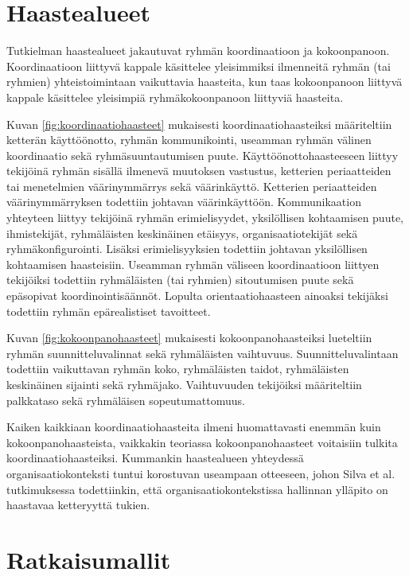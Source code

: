 \section{Haastealueet}

Tutkielman haastealueet jakautuvat ryhmän koordinaatioon ja kokoonpanoon. Koordinaatioon liittyvä kappale käsittelee yleisimmiksi ilmenneitä ryhmän (tai ryhmien) yhteistoimintaan vaikuttavia haasteita, kun taas kokoonpanoon liittyvä kappale käsittelee yleisimpiä ryhmäkokoonpanoon liittyviä haasteita. 

Kuvan \ref{fig:koordinaatiohaasteet} mukaisesti koordinaatiohaasteiksi määriteltiin ketterän käyttöönotto, ryhmän kommunikointi, useamman ryhmän välinen koordinaatio sekä ryhmäsuuntautumisen puute. Käyttöönottohaasteeseen liittyy tekijöinä ryhmän sisällä ilmenevä muutoksen vastustus, ketterien periaatteiden tai menetelmien väärinymmärrys sekä väärinkäyttö. Ketterien periaatteiden väärinymmärryksen todettiin johtavan väärinkäyttöön. Kommunikaation yhteyteen liittyy tekijöinä ryhmän erimielisyydet, yksilöllisen kohtaamisen puute, ihmistekijät, ryhmäläisten keskinäinen etäisyys, organisaatiotekijät sekä ryhmäkonfigurointi. Lisäksi erimielisyyksien todettiin johtavan yksilöllisen kohtaamisen haasteisiin. Useamman ryhmän väliseen koordinaatioon liittyen tekijöiksi todettiin ryhmäläisten (tai ryhmien) sitoutumisen puute sekä epäsopivat koordinointisäännöt. Lopulta orientaatiohaasteen ainoaksi tekijäksi todettiin ryhmän epärealistiset tavoitteet.

Kuvan \ref{fig:kokoonpanohaasteet} mukaisesti kokoonpanohaasteiksi lueteltiin ryhmän suunnitteluvalinnat sekä ryhmäläisten vaihtuvuus. Suunnitteluvalintaan todettiin vaikuttavan ryhmän koko, ryhmäläisten taidot, ryhmäläisten keskinäinen sijainti sekä ryhmäjako. Vaihtuvuuden tekijöiksi määriteltiin palkkataso sekä ryhmäläisen sopeutumattomuus. 

Kaiken kaikkiaan koordinaatiohaasteita ilmeni huomattavasti enemmän kuin kokoonpanohaasteista, vaikkakin teoriassa kokoonpanohaasteet voitaisiin tulkita koordinaatiohaasteiksi. Kummankin haastealueen yhteydessä organisaatiokonteksti tuntui korostuvan useampaan otteeseen, johon Silva et al. \cite{SELLERISILVA201520} tutkimuksessa todettiinkin, että organisaatiokontekstissa hallinnan ylläpito on haastavaa ketteryyttä tukien.

\section{Ratkaisumallit}

